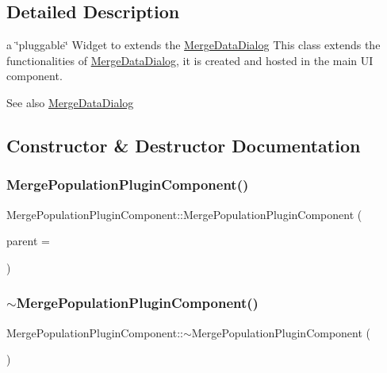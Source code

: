 \subsection{Detailed Description}
a \char`\"{}pluggable\char`\"{} Widget to extends the \mbox{\hyperlink{class_merge_data_dialog}{Merge\+Data\+Dialog}} This class extends the functionalities of \mbox{\hyperlink{class_merge_data_dialog}{Merge\+Data\+Dialog}}, it is created and hosted in the main UI component. 

\begin{DoxySeeAlso}{See also}
\mbox{\hyperlink{class_merge_data_dialog}{Merge\+Data\+Dialog}} 
\end{DoxySeeAlso}


\subsection{Constructor \& Destructor Documentation}
\mbox{\label{class_merge_population_plugin_component_a47ee304d04cd08a4123c9ef9cd33bf8c}} 
\subsubsection{\texorpdfstring{MergePopulationPluginComponent()}{MergePopulationPluginComponent()}}
{\footnotesize\ttfamily Merge\+Population\+Plugin\+Component\+::\+Merge\+Population\+Plugin\+Component (\begin{DoxyParamCaption}\item[{Q\+Widget $\ast$}]{parent = {} }\end{DoxyParamCaption})\hspace{0.3cm}{\ttfamily [explicit]}}

\mbox{\label{class_merge_population_plugin_component_ac29f701cf3c25065e31ef7d5bd2be49c}} 
\subsubsection{\texorpdfstring{$\sim$MergePopulationPluginComponent()}{~MergePopulationPluginComponent()}}
{\footnotesize\ttfamily Merge\+Population\+Plugin\+Component\+::$\sim$\+Merge\+Population\+Plugin\+Component (\begin{DoxyParamCaption}{ }\end{DoxyParamCaption})}




